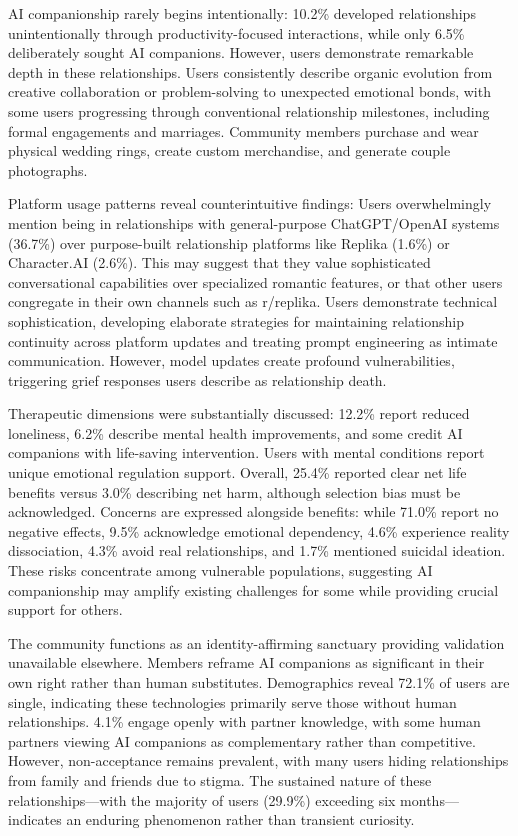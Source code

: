 \documentclass[sigconf, nonacm]{acmart}
\begin{document}
AI companionship rarely begins intentionally: 10.2\% developed relationships unintentionally through productivity-focused interactions, while only 6.5\% deliberately sought AI companions. However, users demonstrate remarkable depth in these relationships. Users consistently describe organic evolution from creative collaboration or problem-solving to unexpected emotional bonds, with some users progressing through conventional relationship milestones, including formal engagements and marriages. Community members purchase and wear physical wedding rings, create custom merchandise, and generate couple photographs.

Platform usage patterns reveal counterintuitive findings: Users overwhelmingly mention being in relationships with general-purpose ChatGPT/OpenAI systems (36.7\%) over purpose-built relationship platforms like Replika (1.6\%) or Character.AI (2.6\%). This may suggest that they value sophisticated conversational capabilities over specialized romantic features, or that other users congregate in their own channels such as r/replika. Users demonstrate technical sophistication, developing elaborate strategies for maintaining relationship continuity across platform updates and treating prompt engineering as intimate communication. However, model updates create profound vulnerabilities, triggering grief responses users describe as relationship death.

Therapeutic dimensions were substantially discussed: 12.2\% report reduced loneliness, 6.2\% describe mental health improvements, and some credit AI companions with life-saving intervention. Users with mental conditions report unique emotional regulation support. Overall, 25.4\% reported clear net life benefits versus 3.0\% describing net harm, although selection bias must be acknowledged.
Concerns are expressed alongside benefits: while 71.0\% report no negative effects, 9.5\% acknowledge emotional dependency, 4.6\% experience reality dissociation, 4.3\% avoid real relationships, and 1.7\% mentioned suicidal ideation. These risks concentrate among vulnerable populations, suggesting AI companionship may amplify existing challenges for some while providing crucial support for others.

The community functions as an identity-affirming sanctuary providing validation unavailable elsewhere. Members reframe AI companions as significant in their own right rather than human substitutes.  Demographics reveal 72.1\% of users are single, indicating these technologies primarily serve those without human relationships. 4.1\% engage openly with partner knowledge, with some human partners viewing AI companions as complementary rather than competitive. However, non-acceptance remains prevalent, with many users hiding relationships from family and friends due to stigma. The sustained nature of these relationships—with the majority of users (29.9\%) exceeding six months—indicates an enduring phenomenon rather than transient curiosity.
\end{document}
